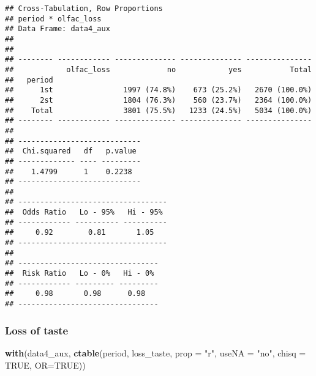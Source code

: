 \documentclass[
]{article}
\newenvironment{Shaded}{\begin{snugshade}}{\end{snugshade}}
\newcommand{\DataTypeTok}[1]{\textcolor[rgb]{0.13,0.29,0.53}{#1}}
\newcommand{\KeywordTok}[1]{\textcolor[rgb]{0.13,0.29,0.53}{\textbf{#1}}}
\newcommand{\NormalTok}[1]{#1}
\newcommand{\OtherTok}[1]{\textcolor[rgb]{0.56,0.35,0.01}{#1}}
\newcommand{\StringTok}[1]{\textcolor[rgb]{0.31,0.60,0.02}{#1}}
\begin{document}
\begin{verbatim}
## Cross-Tabulation, Row Proportions  
## period * olfac_loss  
## Data Frame: data4_aux  
## 
## 
## -------- ------------ -------------- -------------- ---------------
##            olfac_loss             no            yes           Total
##   period                                                           
##      1st                1997 (74.8%)    673 (25.2%)   2670 (100.0%)
##      2st                1804 (76.3%)    560 (23.7%)   2364 (100.0%)
##    Total                3801 (75.5%)   1233 (24.5%)   5034 (100.0%)
## -------- ------------ -------------- -------------- ---------------
## 
## ----------------------------
##  Chi.squared   df   p.value 
## ------------- ---- ---------
##    1.4799      1    0.2238  
## ----------------------------
## 
## ----------------------------------
##  Odds Ratio   Lo - 95%   Hi - 95% 
## ------------ ---------- ----------
##     0.92        0.81       1.05   
## ----------------------------------
## 
## --------------------------------
##  Risk Ratio   Lo - 0%   Hi - 0% 
## ------------ --------- ---------
##     0.98       0.98      0.98   
## --------------------------------
\end{verbatim}

\hypertarget{loss-of-taste-2}{%
\subsubsection{Loss of taste}\label{loss-of-taste-2}}

\begin{Shaded}
\begin{Highlighting}[]
\KeywordTok{with}\NormalTok{(data4_aux, }\KeywordTok{ctable}\NormalTok{(period, loss_taste, }\DataTypeTok{prop =} \StringTok{"r"}\NormalTok{, }\DataTypeTok{useNA =} \StringTok{"no"}\NormalTok{, }\DataTypeTok{chisq =} \OtherTok{TRUE}\NormalTok{, }\DataTypeTok{OR=}\OtherTok{TRUE}\NormalTok{))}
\end{Highlighting}
\end{Shaded}
\end{document}
